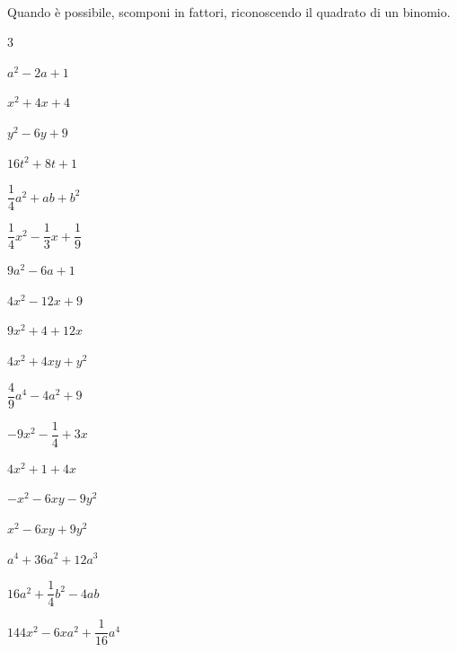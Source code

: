 \paragraph*{}

\begin{esercizio}
\label{ese:div.020}
Quando è possibile, scomponi in fattori, riconoscendo il quadrato di un binomio.
\begin{htmulticols}{3}
\begin{enumeratea}
\item \(a^{2}-2a+1\)
\item \(x^{2}+4x+4\)
\item \(y^{2}-6y+9\)
\item \(16t^{2}+8t+1\)
\item \(\dfrac{1}{4}a^{2}+ab+b^{2}\)
\item \(\dfrac{1}{4}x^{2}-\dfrac{1}{3}x+\dfrac{1}{9}\)
\item \(9a^{2}-6a+1\)
\item \(4x^{2}-12x+9\)
\item \(9x^{2}+4+12x\)
\item \(4x^{2}+4xy+y^{2}\)
\item \(\dfrac{4}{9}a^{{4}}-4a^{2}+9\)
\item \(-9x^{2}-\dfrac{1}{4}+3x\)
\item \(4x^{2}+1+4x\)
\item \(-x^{2}-6xy-9y^{2}\)
\item \(x^{2}-6xy+9y^{2}\)
\item \(a^{4}+36a^{2}+12a^{3}\)
\item \(16a^{2}+\dfrac{1}{4}b^{2}-4ab\)
\item \(144x^{2}-6xa^{2}+\dfrac{1}{16}a^{4}\)
\end{enumeratea}
\end{htmulticols}
\end{esercizio}

